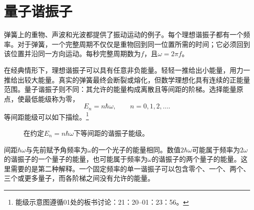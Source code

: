 \begin{classroomqa}
\end{classroomqa}

\begin{classroomqa}
\end{classroomqa}

\section{量子谐振子}

弹簧上的重物、声波和光波都提供了振动运动的例子。每个理想谐振子都有一个频率。对于弹簧，一个完整周期不仅仅是重物回到同一位置所需的时间；它必须回到该位置并沿同一方向运动。每秒完整周期数为\(f\)，且\(\omega=2\pi f\)。

在经典情形下，理想谐振子可以具有任意非负能量。轻轻一推给出小能量，用力一推给出较大能量。真实的弹簧最终会断裂或熔化，但数学理想化具有连续的正能量范围。量子谐振子则不同：其允许的能量构成离散且等间距的阶梯。选择能量原点，使最低能级称为零，
\begin{equation}
E_n=n\hbar\omega,
\qquad n=0,1,2,\ldots .
\end{equation}
等间距能级可以如下描绘。\footnote{能级示意图遵循01处的板书讨论：21：20--01：23：56。}

\begin{figure}[t]
\centering
{}
\caption{在约定\(E_n=n\hbar\omega\)下等间距的谐振子能级。}
\end{figure}

间距\(\hbar\omega\)与先前赋予角频率为\(\omega\)的一个光子的能量相同。数值\(2\hbar\omega\)可能属于频率为\(2\omega\)的谐振子的一个量子的能量，也可能属于频率为\(\omega\)的谐振子的两个量子的能量。这里需要的是第二种解释。一个固定频率的单一谐振子可以包含零个、一个、两个、三个或更多量子，而各阶梯之间没有允许的能量。

